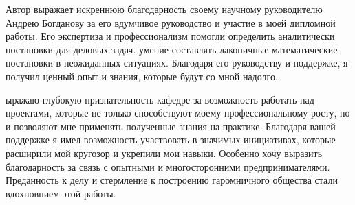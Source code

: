 Автор выражает искреннюю благодарность своему научному руководителю Андрею Богданову за его вдумчивое руководство и участие в моей дипломной работы. Его экспертиза и профессионализм помогли определить аналитически постановки для деловых задач. умение составлять лаконичные математические постановки в неожиданных ситуациях. Благодаря его руководству и поддержке, я получил ценный опыт и знания, которые будут со мной надолго.

ыражаю глубокую признательность кафедре за возможность работать над проектами, которые не только способствуют моему профессиональному росту, но и позволяют мне применять полученные знания на практике. Благодаря вашей поддержке я имел возможность участвовать в значимых инициативах, которые расширили мой кругозор и укрепили мои навыки. Особенно хочу выразить благодарность за связь с опытными и многосторонними предпринимателями. Преданность к делу и стермление к построению гаромничного общества стали вдохновнием этой работы.

